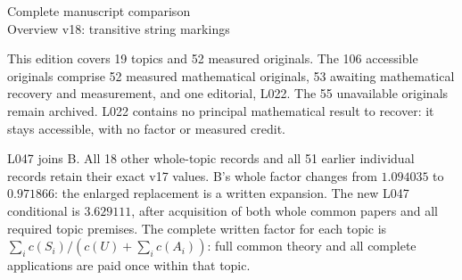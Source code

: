 \documentclass[11pt,a4paper]{article}
\begin{document}
\begin{center}{\Large Complete manuscript comparison}\\[3pt]
Overview v18: transitive string markings\end{center}
This edition covers 19 topics and 52 measured originals. The 106 accessible originals comprise 52 measured mathematical originals, 53 awaiting mathematical recovery and measurement, and one editorial, L022. The 55 unavailable originals remain archived. L022 contains no principal mathematical result to recover: it stays accessible, with no factor or measured credit.

L047 joins B. All 18 other whole-topic records and all 51 earlier individual records retain their exact v17 values. B's whole factor changes from $1.094035$ to $0.971866$: the enlarged replacement is a written expansion. The new L047 conditional is $3.629111$, after acquisition of both whole common papers and all required topic premises. The complete written factor for each topic is $\sum_i c(S_i)/(c(U)+\sum_i c(A_i))$: full common theory and all complete applications are paid once within that topic.
\end{document}
